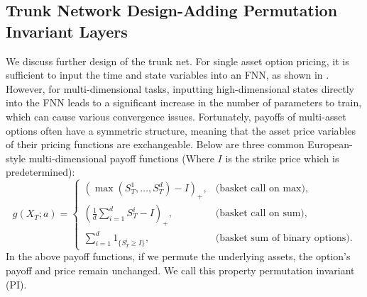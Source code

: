 \documentclass[11pt,a4paper]{article}
\theoremstyle{remark}
\begin{document}
	
	
	
	\subsection{Trunk Network Design-Adding Permutation Invariant Layers}
	We discuss further design of the  trunk net.  For single asset option pricing, it is sufficient to input the time and state variables into an FNN, as shown in \cite{lu2021learning}. However, for multi-dimensional tasks, inputting high-dimensional states directly into the FNN leads to a significant increase in the number of parameters to train, which can cause various convergence issues. Fortunately, payoffs of multi-asset options often have a symmetric structure, meaning that the asset price variables of their pricing functions are exchangeable. Below are three common European-style multi-dimensional payoff functions (Where $I$ is the strike price which is predetermined):
	\begin{equation}
		g(X_T; a)= \begin{cases}\left(\max \left(S^1_T, \ldots, S^d_T\right)-I\right)_{+}, & \text {(basket call on max), } \\ \left(\frac{1}{d}\sum_{i=1}^d S^i_T-I\right)_{+}, & \text {(basket call on sum), } \\ \sum_{i=1}^d 1_{\{S^i_T \geq I\}}, & \text {(basket sum of binary options).}\end{cases}
	\end{equation}
	In the above payoff functions, if we permute the underlying assets, the option's payoff and price remain unchanged. We call this property permutation invariant (PI). 
	
\end{document}
